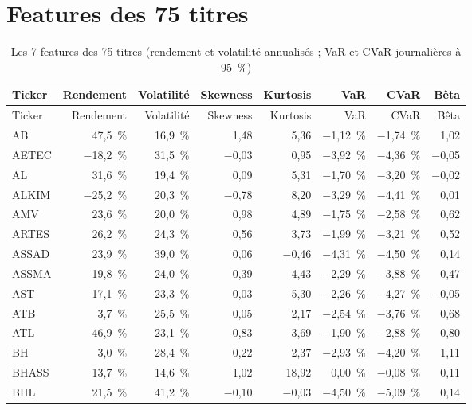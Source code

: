 \documentclass[11pt,a4paper]{article}
\begin{document}
\section{Features des 75 titres}\label{ann:features}
{\small\begin{longtable}{lrrrrrrr}
\caption{Les 7 features des 75 titres (rendement et volatilité annualisés ; VaR et CVaR journalières à 95~\%)}\label{tab:annexe-features}\\
\toprule Ticker & Rendement & Volatilité & Skewness & Kurtosis & VaR & CVaR & Bêta \\ \midrule \endfirsthead
\toprule Ticker & Rendement & Volatilité & Skewness & Kurtosis & VaR & CVaR & Bêta \\ \midrule \endhead \bottomrule \endfoot
AB & 47{,}5~\% & 16{,}9~\% & 1{,}48 & 5{,}36 & $-$1{,}12~\% & $-$1{,}74~\% & 1{,}02 \\
AETEC & $-$18{,}2~\% & 31{,}5~\% & $-$0{,}03 & 0{,}95 & $-$3{,}92~\% & $-$4{,}36~\% & $-$0{,}05 \\
AL & 31{,}6~\% & 19{,}4~\% & 0{,}09 & 5{,}31 & $-$1{,}70~\% & $-$3{,}20~\% & $-$0{,}02 \\
ALKIM & $-$25{,}2~\% & 20{,}3~\% & $-$0{,}78 & 8{,}20 & $-$3{,}29~\% & $-$4{,}41~\% & 0{,}01 \\
AMV & 23{,}6~\% & 20{,}0~\% & 0{,}98 & 4{,}89 & $-$1{,}75~\% & $-$2{,}58~\% & 0{,}62 \\
ARTES & 26{,}2~\% & 24{,}3~\% & 0{,}56 & 3{,}73 & $-$1{,}99~\% & $-$3{,}21~\% & 0{,}52 \\
ASSAD & 23{,}9~\% & 39{,}0~\% & 0{,}06 & $-$0{,}46 & $-$4{,}31~\% & $-$4{,}50~\% & 0{,}14 \\
ASSMA & 19{,}8~\% & 24{,}0~\% & 0{,}39 & 4{,}43 & $-$2{,}29~\% & $-$3{,}88~\% & 0{,}47 \\
AST & 17{,}1~\% & 23{,}3~\% & 0{,}03 & 5{,}30 & $-$2{,}26~\% & $-$4{,}27~\% & $-$0{,}05 \\
ATB & 3{,}7~\% & 25{,}5~\% & 0{,}05 & 2{,}17 & $-$2{,}54~\% & $-$3{,}76~\% & 0{,}68 \\
ATL & 46{,}9~\% & 23{,}1~\% & 0{,}83 & 3{,}69 & $-$1{,}90~\% & $-$2{,}88~\% & 0{,}80 \\
BH & 3{,}0~\% & 28{,}4~\% & 0{,}22 & 2{,}37 & $-$2{,}93~\% & $-$4{,}20~\% & 1{,}11 \\
BHASS & 13{,}7~\% & 14{,}6~\% & 1{,}02 & 18{,}92 & 0{,}00~\% & $-$0{,}08~\% & 0{,}11 \\
BHL & 21{,}5~\% & 41{,}2~\% & $-$0{,}10 & $-$0{,}03 & $-$4{,}50~\% & $-$5{,}09~\% & 0{,}14 \\

\end{longtable}}
\end{document}

